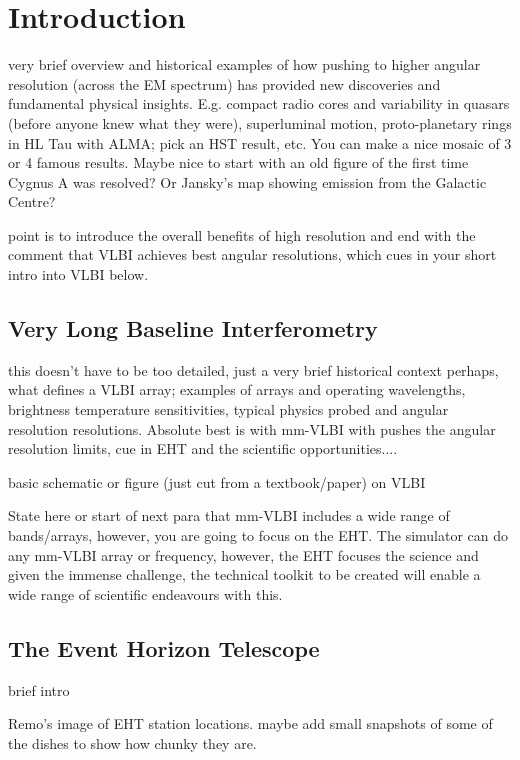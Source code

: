 \documentclass{article}
\begin{document}
\tableofcontents
\section{Introduction}

very brief overview and historical examples of how pushing to higher angular resolution (across the EM spectrum) has provided new discoveries and fundamental physical insights. E.g. compact radio cores and variability in quasars (before anyone knew what they were), superluminal motion, proto-planetary rings in HL Tau with ALMA; pick an HST result, etc. You can make a nice mosaic of 3 or 4 famous results. Maybe nice to start with an old figure of the first time Cygnus A was resolved? Or Jansky's map showing emission from the Galactic Centre? 

point is to introduce the overall benefits of high resolution and end with the comment that VLBI achieves best angular resolutions, which cues in your short intro into VLBI below.


\subsection{Very Long Baseline Interferometry}

this doesn't have to be too detailed, just a very brief historical context perhaps, what defines a VLBI array; examples of arrays and operating wavelengths, brightness temperature sensitivities, typical physics probed and angular resolution resolutions. Absolute best is with mm-VLBI with pushes the angular resolution limits, cue in EHT and the scientific opportunities....

basic schematic or figure (just cut from a textbook/paper) on VLBI

State here or start of next para that mm-VLBI includes a wide range of bands/arrays, however, you are going to focus on the EHT. The simulator can do any mm-VLBI array or frequency, however, the EHT focuses the science and given the immense challenge, the technical toolkit to be created will enable a wide range of scientific endeavours with this. 

\subsection{The Event Horizon Telescope}

brief intro

Remo's image of EHT station locations. maybe add small snapshots of some of the dishes to show how chunky they are. 
\end{document}
